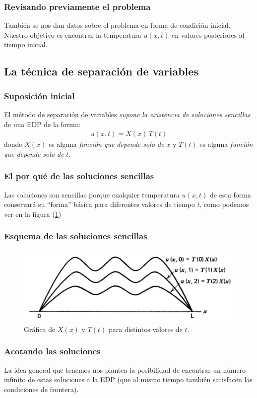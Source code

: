 \documentclass[12pt]{beamer}
\begin{document}
\begin{frame}
\frametitle{Revisando previamente el problema}
También se nos dan datos sobre el problema en forma de condición inicial.
\\
\bigskip
\pause
Nuestro objetivo es encontrar la temperatura $u (x, t)$ en valores posteriores al tiempo inicial.
\end{frame}

\subsection{La técnica de separación de variables}

\begin{frame}
\frametitle{Suposición inicial}
El método de separación de variables \emph{supone la existencia de soluciones sencillas} de una EDP de la forma:
\pause
\begin{align*}
u(x, t) =  X(x) \, T(t)
\end{align*}
\pause
donde $X (x)$ es alguna \emph{función que depende solo de} $x$ y $T (t)$ es alguna \emph{función que depende solo de} $t$.
\end{frame}
\begin{frame}
\frametitle{El por qué de las soluciones sencillas}
Las soluciones son sencillas porque cualquier temperatura $u (x, t)$ de esta forma conservará su \enquote{forma} básica para diferentes valores de tiempo $t$, como podemos ver en la figura (\ref{fig:figura_separacion_variables_01})
\end{frame}
\begin{frame}
\frametitle{Esquema de las soluciones sencillas}
\begin{figure}[H]
    \centering
    \includegraphics[scale=0.35]{Imagenes/Separacion_Variables_01.png}
    \caption{Gráfica de $X(x)$ y $T(t)$ para distintos valores de $t$.}
    \label{fig:figura_separacion_variables_01}
\end{figure}
\end{frame}
\begin{frame}
\frametitle{Acotando las soluciones}
La idea general que tenemos nos plantea la posibilidad de encontrar un número infinito de estas soluciones a la EDP (que al mismo tiempo también satisfacen las condiciones de frontera).
\end{frame}
\end{document}
